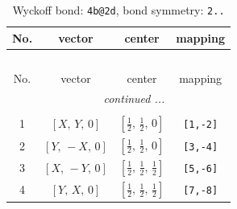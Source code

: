 \documentclass[fleqn,8pt]{jsarticle}
\begin{document}
\renewcommand{\arraystretch}{1.2}
\begin{longtable}{cccc}
\caption{Wyckoff bond: {\tt 4b@2d}, bond symmetry: {\tt 2..}}
 \\
 \hline \hline
No. & vector & center & mapping \\ \hline \endfirsthead

\multicolumn{3}{l}{\tablename\ \thetable{}} \\
 \hline \hline
No. & vector & center & mapping \\ \hline \endhead

 \hline \hline
\multicolumn{3}{r}{\footnotesize\it continued ...} \\ \endfoot

 \hline \hline
\multicolumn{3}{r}{} \\ \endlastfoot

1 & $\left[ X,\, Y,\, 0 \right]$ & $\left[ \frac{1}{2},\, \frac{1}{2},\, 0 \right]$ & {\tt [1,-2]} \\ \hline
2 & $\left[ Y,\, - X,\, 0 \right]$ & $\left[ \frac{1}{2},\, \frac{1}{2},\, 0 \right]$ & {\tt [3,-4]} \\ \hline
3 & $\left[ X,\, - Y,\, 0 \right]$ & $\left[ \frac{1}{2},\, \frac{1}{2},\, \frac{1}{2} \right]$ & {\tt [5,-6]} \\ \hline
4 & $\left[ Y,\, X,\, 0 \right]$ & $\left[ \frac{1}{2},\, \frac{1}{2},\, \frac{1}{2} \right]$ & {\tt [7,-8]} \\
\end{longtable}
\renewcommand{\arraystretch}{1.2}
\end{document}
